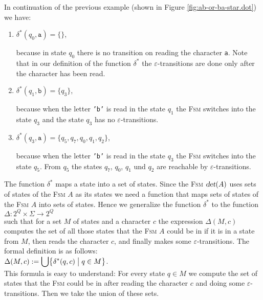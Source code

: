 \exampleEng
In continuation of the previous example (shown in Figure \ref{fig:ab-or-ba-star.dot}) we have:
\begin{enumerate}
\item $\delta^*(q_0, \texttt{a}) = \{\}$,
  
      because in state $q_0$ there is no transition on reading the character \texttt{a}.
      Note that in our definition of the function  $\delta^*$ the 
      $\varepsilon$-transitions are done only after the character has been read.
\item $\delta^*(q_1, \texttt{b}) = \{q_3\}$,

      because when the letter \texttt{'b'} is read in the state $q_1$ the \textsc{Fsm}
      switches into the state $q_3$ and the state $q_3$ has no  $\varepsilon$-transitions.
\item $\delta^*(q_3, \texttt{a}) = \{q_5, q_7, q_0, q_1, q_2\}$,

      because when the letter \texttt{'b'} is read in the state $q_3$ the \textsc{Fsm}
      switches into the state $q_5$.  From $q_5$ the states $q_7$, $q_0$, $q_1$ und $q_2$
      are reachable by $\varepsilon$-transitions. \eox
\end{enumerate}
The function  $\delta^*$ maps a state into a set of states.  Since the \textsc{Fsm} $\textsl{det}(A)$ uses
sets of states of the \textsc{Fsm} $A$ as its states we need a function that maps sets of states of the
\textsc{Fsm} $A$ into sets of states.  Hence we generalize 
the function $\delta^*$ to the function
\\[0.2cm]
\hspace*{1.3cm}
$\Delta: 2^Q \times \Sigma \rightarrow 2^Q$
\\[0.2cm]
such that for a set $M$ of states and a character $c$ the expression $\Delta(M, c)$
computes the set of all those states that the \textsc{Fsm} $A$ could be in if it is in a state from $M$, then
reads the character $c$, and finally makes some $\varepsilon$-transitions.
The formal definition is as follows: 
\\[0.2cm]
\hspace*{1.3cm}
$\displaystyle \Delta(M,c) := \bigcup \bigl\{ \delta^*(q,c) \bigm| q \in M \bigr\}$. 
\\[0.2cm]
This formula is easy to understand:  For every state  $q \in M$ we compute the set of states that the
\textsc{Fsm} could be in after reading the character $c$ and doing some 
$\varepsilon$-transitions.  Then we take the union of these sets.

